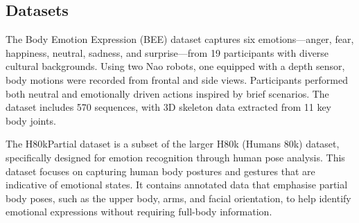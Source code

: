 \subsection{Datasets}
The Body Emotion Expression (BEE) dataset \cite{Elfaramawy2017-ab} captures six emotions—anger, fear, happiness, neutral, sadness, and surprise—from 19 participants with diverse cultural backgrounds. Using two Nao robots, one equipped with a depth sensor, body motions were recorded from frontal and side views. Participants performed both neutral and emotionally driven actions inspired by brief scenarios. The dataset includes 570 sequences, with 3D skeleton data extracted from 11 key body joints.

The H80kPartial dataset \cite{8578328} is a subset of the larger H80k (Humans 80k) dataset, specifically designed for emotion recognition through human pose analysis. This dataset focuses on capturing human body postures and gestures that are indicative of emotional states. It contains annotated data that emphasise partial body poses, such as the upper body, arms, and facial orientation, to help identify emotional expressions without requiring full-body information.

\clearpage{}
